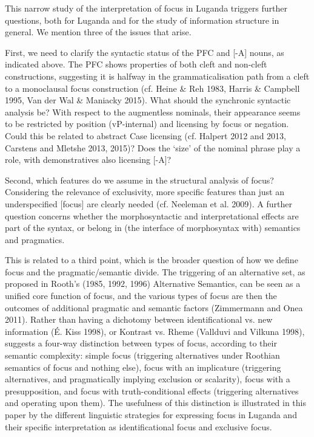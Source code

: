 \documentclass[output=paper]{langsci/langscibook}
\begin{document}
This narrow study of the interpretation of focus in Luganda triggers further questions, both for Luganda and for the study of information structure in general. We mention three of the issues that arise.

First, we need to clarify the syntactic status of the PFC and [-A] nouns, as indicated above. The PFC shows properties of both cleft and non-cleft constructions, suggesting it is halfway in the grammaticalisation path from a cleft to a monoclausal focus construction (cf. Heine \& Reh 1983, Harris \& Campbell 1995, Van der Wal \& Maniacky 2015). What should the synchronic syntactic analysis be? With respect to the augmentless nominals, their appearance seems to be restricted by position (vP-internal) and licensing by focus or negation. Could this be related to abstract Case licensing (cf. Halpert 2012 and 2013, Carstens and Mletshe 2013, 2015)? Does the ‘size’ of the nominal phrase play a role, with demonstratives also licensing [-A]?

Second, which features do we assume in the structural analysis of focus? Considering the relevance of exclusivity, more specific features than just an underspecified [focus] are clearly needed (cf. Neeleman et al. 2009). A further question concerns whether the morphosyntactic and interpretational effects are part of the syntax, or belong in (the interface of morphosyntax with) semantics and pragmatics.

This is related to a third point, which is the broader question of how we define focus and the pragmatic/semantic divide. The triggering of an alternative set, as proposed in Rooth’s (1985, 1992, 1996) Alternative Semantics, can be seen as a unified core function of focus, and the various types of focus are then the outcomes of additional pragmatic and semantic factors (Zimmermann and Onea 2011). Rather than having a dichotomy between identificational vs. new information (É. Kiss 1998), or Kontrast vs. Rheme (Vallduvi and Vilkuna 1998), \citet{Bazalgette2015} suggests a four-way distinction between types of focus, according to their semantic complexity: simple focus (triggering alternatives under Roothian semantics of focus and nothing else), focus with an implicature (triggering alternatives, and pragmatically implying exclusion or scalarity), focus with a presupposition, and focus with truth-conditional effects (triggering alternatives and operating upon them). The usefulness of this distinction is illustrated in this paper by the different linguistic strategies for expressing focus in Luganda and their specific interpretation as identificational focus and exclusive focus.
\end{document}
